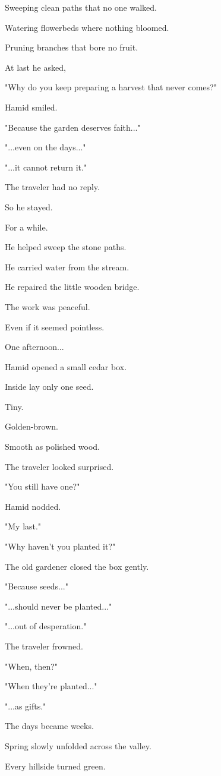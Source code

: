 \documentclass[12pt,openany]{book}
\begin{document}
Sweeping clean paths that no one walked.

Watering flowerbeds where nothing bloomed.

Pruning branches that bore no fruit.

At last he asked,

"Why do you keep preparing a harvest that never comes?"

Hamid smiled.

"Because the garden deserves faith..."

"...even on the days..."

"...it cannot return it."

The traveler had no reply.

So he stayed.

For a while.

He helped sweep the stone paths.

He carried water from the stream.

He repaired the little wooden bridge.

The work was peaceful.

Even if it seemed pointless.

One afternoon...

Hamid opened a small cedar box.

Inside lay only one seed.

Tiny.

Golden-brown.

Smooth as polished wood.

The traveler looked surprised.

"You still have one?"

Hamid nodded.

"My last."

"Why haven't you planted it?"

The old gardener closed the box gently.

"Because seeds..."

"...should never be planted..."

"...out of desperation."

The traveler frowned.

"When, then?"

"When they're planted..."

"...as gifts."

The days became weeks.

Spring slowly unfolded across the valley.

Every hillside turned green.
\end{document}
